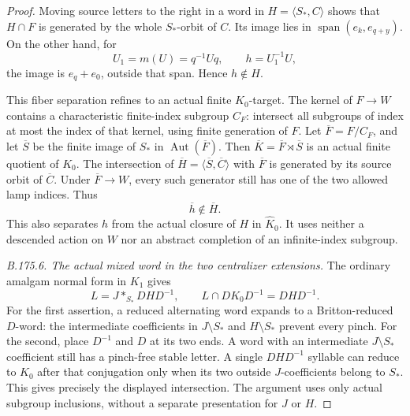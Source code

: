 \begin{proof}
Moving source letters to the right in a word in
\(H=\langle S_*,C\rangle\) shows that \(H\cap F\) is generated by
the whole \(S_*\)-orbit of \(C\). Its image lies in
\(\operatorname{span}(e_k,e_{q+y})\).
On the other hand, for
\begin{equation}\label{eq:B175-fiber-separator}
 U_1=m(U)=q^{-1}Uq,\qquad h=U_1^{-1}U,
\end{equation}
the image is \(e_q+e_0\), outside that span. Hence \(h\notin H\).

This fiber separation refines to an actual finite \(K_0\)-target.
The kernel of \(F\to W\) contains a characteristic finite-index
subgroup \(C_F\): intersect all subgroups of index at most the index
of that kernel, using finite generation of \(F\).
Let \(\overline F=F/C_F\), and let \(\overline S\) be the finite
image of \(S_*\) in \(\operatorname{Aut}(\overline F)\).
Then \(\overline K=\overline F\rtimes\overline S\) is an actual
finite quotient of \(K_0\).
The intersection of \(\overline H=\langle\overline S,\overline C\rangle\)
with \(\overline F\) is generated by its source orbit of
\(\overline C\). Under \(\overline F\to W\), every such generator
still has one of the two allowed lamp indices. Thus
\begin{equation}\label{eq:B175-finite-edge-separation}
                        \overline h\notin\overline H.
\end{equation}
This also separates \(h\) from the actual closure of \(H\) in
\(\widehat K_0\). It uses neither a descended action on \(W\) nor
an abstract completion of an infinite-index subgroup.

\emph{B.175.6. The actual mixed word in the two centralizer extensions.}
The ordinary amalgam normal form in \(K_1\) gives
\begin{equation}\label{eq:B175-edge-normal-form}
 L=J*_{S_*}DHD^{-1},\qquad
 L\cap DK_0D^{-1}=DHD^{-1}.
\end{equation}
For the first assertion, a reduced alternating word expands to a
Britton-reduced \(D\)-word: the intermediate coefficients in
\(J\setminus S_*\) and \(H\setminus S_*\) prevent every pinch.
For the second, place \(D^{-1}\) and \(D\) at its two ends. A word
with an intermediate \(J\setminus S_*\) coefficient still has a
pinch-free stable letter. A single \(DHD^{-1}\) syllable can reduce
to \(K_0\) after that conjugation only when its two outside
\(J\)-coefficients belong to \(S_*\). This gives precisely the
displayed intersection. The argument uses only actual subgroup
inclusions, without a separate presentation for \(J\) or \(H\).


\end{proof}
